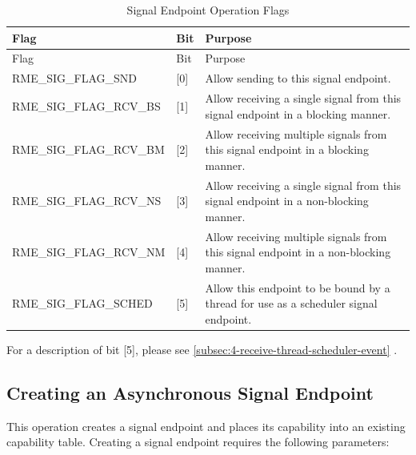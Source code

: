 \begin{xltabular}{\textwidth}{@{}>{\hsize\raggedright\arraybackslash}X>{\hsize\raggedright\arraybackslash}X>{\hsize\raggedright\arraybackslash}X@{}}
\caption{Signal Endpoint Operation Flags}\label{tab:5-15-signal-endpoint-operation-flags}\\
\toprule
Flag & Bit & Purpose\tabularnewline
\endfirsthead
\toprule
Flag & Bit & Purpose\tabularnewline
\midrule
\endhead
\bottomrule
\endlastfoot
RME\_SIG\_FLAG\_SND & {[}0{]} & Allow sending to this signal endpoint.\tabularnewline
RME\_SIG\_FLAG\_RCV\_BS & {[}1{]} &
Allow receiving a single signal from this signal endpoint in a blocking manner.\tabularnewline
RME\_SIG\_FLAG\_RCV\_BM & {[}2{]} &
Allow receiving multiple signals from this signal endpoint in a blocking manner.\tabularnewline
RME\_SIG\_FLAG\_RCV\_NS & {[}3{]} &
Allow receiving a single signal from this signal endpoint in a non-blocking manner.\tabularnewline
RME\_SIG\_FLAG\_RCV\_NM & {[}4{]} &
Allow receiving multiple signals from this signal endpoint in a non-blocking manner.\tabularnewline
RME\_SIG\_FLAG\_SCHED & {[}5{]} &
Allow this endpoint to be bound by a thread for use as a scheduler signal endpoint.\tabularnewline
\end{xltabular}
\nopagebreak[4]

For a description of bit {[}5{]}, please see \ref{subsec:4-receive-thread-scheduler-event}
.

\subsection{Creating an Asynchronous Signal Endpoint}\label{subsec:5-create-async-signal-endpoint}

This operation creates a signal endpoint and places its capability into an existing capability table. Creating a signal endpoint requires the following parameters:

